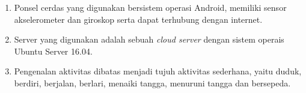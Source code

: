 \begin{enumerate}
\item Ponsel cerdas yang digunakan bersistem operasi Android, memiliki sensor akselerometer dan giroskop serta dapat terhubung dengan internet.
\item Server yang digunakan adalah sebuah \emph{cloud server} dengan sistem operais Ubuntu Server 16.04.
\item Pengenalan aktivitas dibatas menjadi tujuh aktivitas sederhana, yaitu duduk, berdiri, berjalan, berlari, menaiki tangga, menuruni tangga dan bersepeda.
\end{enumerate}
